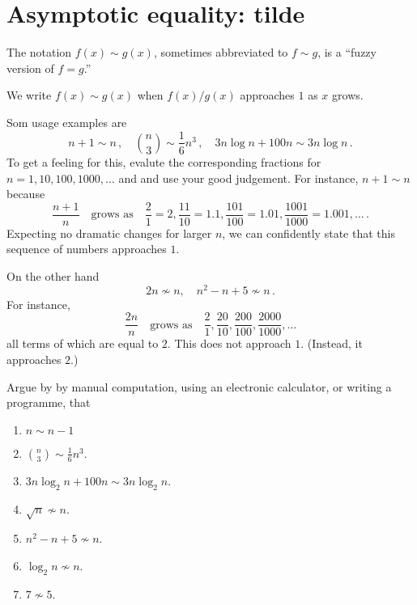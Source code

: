 \documentclass{tstextbook}
\begin{document}
\section{Asymptotic equality: tilde}

The notation \(f(x)\sim g(x)\), sometimes abbreviated to \(f\sim g\), is a “fuzzy version of \(f=g\).”

\begin{definition}
We write \(f(x)\sim g(x)\) when \(f(x)/g(x)\) approaches \(1\) as \(x\) grows.
\end{definition}


\begin{example}
Som usage examples are
\[ n + 1 \sim n\,, \quad \binom{n}{3}\sim \textstyle\frac16n^3\,,\quad 3n\log n + 100 n \sim 3 n\log n\,. \] 
To get a feeling for this, evalute the corresponding fractions for $n=1,10,100,1000,\ldots$ and
  and use your good judgement.
For instance, $n+1\sim n$ because \[
  \frac{n+1}{n} \quad \text{grows as}\quad \frac{2}{1} =2, \frac{11}{10}=1.1, \frac{101}{100}=1.01, \frac{1001}{1000}=1.001,\ldots\,.
\]
Expecting no dramatic changes for larger $n$, we can confidently state that this sequence of numbers approaches $1$.

On the other hand
\[ 2n \not\sim n,\quad n^2 - n + 5 \not\sim n\,. \] 
For instance, \[
  \frac{2n}{n} \quad \text{grows as}\quad \frac{2}{1}, \frac{20}{10}, \frac{200}{100}, \frac{2000}{1000},\ldots
\]
all terms of which are equal to $2$.
This does not approach $1$. 
(Instead, it approaches $2$.)
\end{example}

\begin{exercise}
  Argue by by manual computation, using an electronic calculator, or writing a programme, that
  \begin{enumerate}
    \item
      $n\sim n-1$
    \item
  $\binom{n}{3}\sim \textstyle\frac16n^3$.
    \item
  $3n\log_2 n + 100 n \sim 3 n\log_2 n$.
    \item
      $\sqrt n\not\sim n$.
    \item
   $n^2 - n + 5 \not\sim n$.
    \item
      $\log_2 n\not\sim n$.
    \item
      $7\not\sim 5$.
  \end{enumerate}
\end{exercise}
\end{document}

